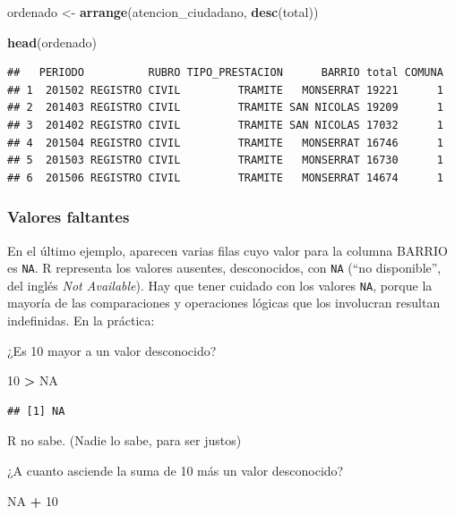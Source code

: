\documentclass[spanish,]{book}
\newenvironment{Shaded}{\begin{snugshade}}{\end{snugshade}}
\newcommand{\DecValTok}[1]{\textcolor[rgb]{0.00,0.00,0.81}{#1}}
\newcommand{\KeywordTok}[1]{\textcolor[rgb]{0.13,0.29,0.53}{\textbf{#1}}}
\newcommand{\NormalTok}[1]{#1}
\newcommand{\OperatorTok}[1]{\textcolor[rgb]{0.81,0.36,0.00}{\textbf{#1}}}
\newcommand{\OtherTok}[1]{\textcolor[rgb]{0.56,0.35,0.01}{#1}}
\newcommand{\StringTok}[1]{\textcolor[rgb]{0.31,0.60,0.02}{#1}}
\begin{document}
\begin{Shaded}
\begin{Highlighting}[]
\NormalTok{ordenado <-}\StringTok{ }\KeywordTok{arrange}\NormalTok{(atencion_ciudadano, }\KeywordTok{desc}\NormalTok{(total))}

\KeywordTok{head}\NormalTok{(ordenado)}
\end{Highlighting}
\end{Shaded}

\begin{verbatim}
##   PERIODO          RUBRO TIPO_PRESTACION      BARRIO total COMUNA
## 1  201502 REGISTRO CIVIL         TRAMITE   MONSERRAT 19221      1
## 2  201403 REGISTRO CIVIL         TRAMITE SAN NICOLAS 19209      1
## 3  201402 REGISTRO CIVIL         TRAMITE SAN NICOLAS 17032      1
## 4  201504 REGISTRO CIVIL         TRAMITE   MONSERRAT 16746      1
## 5  201503 REGISTRO CIVIL         TRAMITE   MONSERRAT 16730      1
## 6  201506 REGISTRO CIVIL         TRAMITE   MONSERRAT 14674      1
\end{verbatim}

\hypertarget{valores-faltantes}{%
\subsubsection{Valores faltantes}\label{valores-faltantes}}

En el último ejemplo, aparecen varias filas cuyo valor para la columna BARRIO es \texttt{NA}. R representa los valores ausentes, desconocidos, con \texttt{NA} (``no disponible'', del inglés \emph{Not Available}). Hay que tener cuidado con los valores \texttt{NA}, porque la mayoría de las comparaciones y operaciones lógicas que los involucran resultan indefinidas. En la práctica:

¿Es 10 mayor a un valor desconocido?

\begin{Shaded}
\begin{Highlighting}[]
\DecValTok{10} \OperatorTok{>}\StringTok{ }\OtherTok{NA}
\end{Highlighting}
\end{Shaded}

\begin{verbatim}
## [1] NA
\end{verbatim}

R no sabe. (Nadie lo sabe, para ser justos)

¿A cuanto asciende la suma de 10 más un valor desconocido?

\begin{Shaded}
\begin{Highlighting}[]
\OtherTok{NA} \OperatorTok{+}\StringTok{ }\DecValTok{10}
\end{Highlighting}
\end{Shaded}
\end{document}

